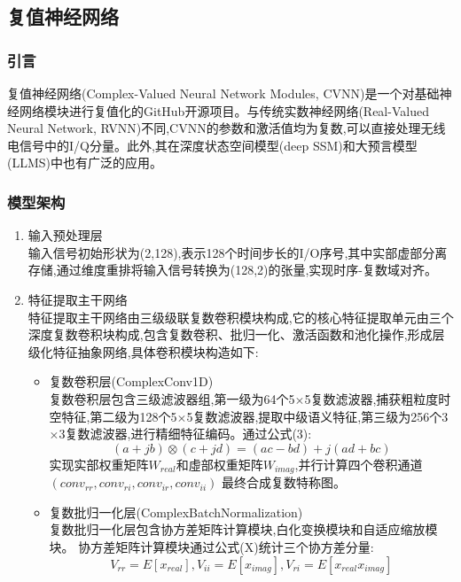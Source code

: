 \documentclass{article}
\begin{document}
\begin{CJK}{UTF8}{gbsn}
\subsection{复值神经网络}
\subsubsection{引言}
复值神经网络(Complex-Valued Neural Network Modules, CVNN)是一个对基础神经网络模块进行复值化的GitHub开源项目。与传统实数神经网络(Real-Valued Neural Network, RVNN)不同,CVNN的参数和激活值均为复数,可以直接处理无线电信号中的I/Q分量。此外,其在深度状态空间模型(deep SSM)和大预言模型(LLMS)中也有广泛的应用。

\subsubsection{模型架构}
\begin{enumerate}
    \item 输入预处理层 \\
    输入信号初始形状为(2,128),表示128个时间步长的I/O序号,其中实部虚部分离存储,通过维度重排将输入信号转换为(128,2)的张量,实现时序-复数域对齐。
    \item 特征提取主干网络 \\
    特征提取主干网络由三级级联复数卷积模块构成,它的核心特征提取单元由三个深度复数卷积块构成,包含复数卷积、批归一化、激活函数和池化操作,形成层级化特征抽象网络,具体卷积模块构造如下:
    \begin{itemize}
        \item 复数卷积层(ComplexConv1D) \\
        复数卷积层包含三级滤波器组,第一级为64个5$\times$5复数滤波器,捕获粗粒度时空特征,第二级为128个5$\times$5复数滤波器,提取中级语义特征,第三级为256个3$\times$3复数滤波器,进行精细特征编码。通过公式(3):
        \begin{equation}
            (a+jb)\otimes(c+jd)=(ac-bd)+j(ad+bc)
            \label{eq:complex_conv}
        \end{equation}
        实现实部权重矩阵$W_{real}$和虛部权重矩阵$W_{imag}$,并行计算四个卷积通道$(conv_{rr},conv_{ri},conv_{ir},conv_{ii})$ 最终合成复数特称图。
        \item 复数批归一化层(ComplexBatchNormalization) \\
        复数批归一化层包含协方差矩阵计算模块,白化变换模块和自适应缩放模块。
        协方差矩阵计算模块通过公式(X)统计三个协方差分量:
        \begin{equation}
            V_{rr} = E[x_{real}], V_{ii} = E[x_{imag}], V_{ri}=E[x_{real}x_{imag}]

\end{equation}
\end{itemize}
\end{enumerate}
\end{CJK}
\end{document}
